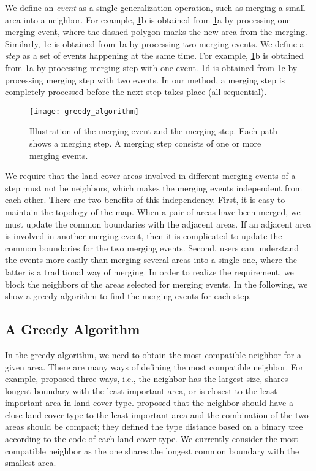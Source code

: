 \documentclass[ijgi,article,submit,moreauthors,pdftex]{Definitions/mdpi}
\begin{document}
We define an \emph{event} as a single generalization operation, 
such as merging a small area into a neighbor.
For example, \fig\ref{fig:event_and_step}b is obtained from 
\fig\ref{fig:event_and_step}a by processing one merging event,
where the dashed polygon marks the new area from the merging.
Similarly, \fig\ref{fig:event_and_step}c is obtained from 
\fig\ref{fig:event_and_step}a by processing two merging events.
We define a \emph{step} as 
a set of events happening at the same time.
For example, 
\fig\ref{fig:event_and_step}b is obtained from 
\fig\ref{fig:event_and_step}a by processing merging step with one event.
\fig\ref{fig:event_and_step}d is obtained from 
\fig\ref{fig:event_and_step}c by processing merging step with two events.
In our method, a merging step is completely processed 
before the next step takes place (all sequential). 

\begin{figure}[tb]
\centering
\texttt{[image: greedy\_algorithm]}
\caption{Illustration of the merging event and the merging step. 
Each path shows a merging step. 
A merging step consists of one or more merging events.}
\label{fig:event_and_step}
\end{figure}


We require that 
the land-cover areas involved in different merging events of a step 
must not be neighbors, 
which makes the merging events independent from each other.
There are two benefits of this independency.
First, it is easy to maintain the topology of the map.
When a pair of areas have been merged, 
we must update the common boundaries with the adjacent areas.
If an adjacent area is involved in another merging event,
then it is complicated to update the common boundaries 
for the two merging events.
Second, users can understand the events more easily 
than merging several areas into a single one,
where the latter is a traditional way of merging.
In order to realize the requirement, 
we block the neighbors of the areas selected for merging events.
In the following, we show a greedy algorithm 
to find the merging events for each step.


\subsection{A Greedy Algorithm}
\label{sec:greedy_algo}

In the greedy algorithm, we need to obtain the most compatible neighbor 
for a given area.
There are many ways of defining the most compatible neighbor.
For example, \citet{Cheng2006} proposed three ways, i.e.,
the neighbor has the largest size, 
shares longest boundary with the least important area,
or is closest to the least important area in land-cover type. 
\citet{Peng2017AStar} proposed that 
the neighbor should have a close land-cover type
to the least important area
and the combination of the two areas should be compact;
they defined the type distance based on a binary tree
according to the code of each land-cover type.
We currently consider the most compatible neighbor
as the one shares the longest common boundary with the smallest area.
\end{document}
